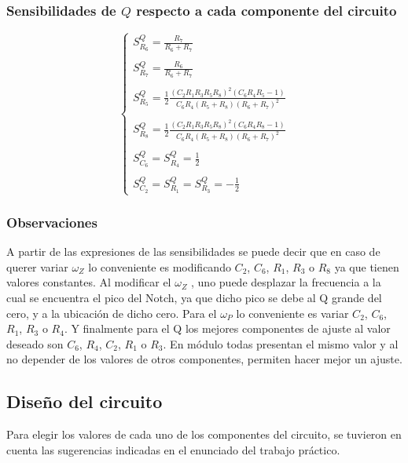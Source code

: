 \subsubsection{Sensibilidades de $Q$ respecto a cada componente del circuito}
\begin{equation}
\begin{cases}
S^{Q}_{R_6} = \frac{R_{7}}{R_{6} + R_{7}}\\ \\
S^{Q}_{R_7} = \frac{R_{6}}{R_{6} + R_{7}}\\ \\
S^{Q}_{R_5} = \frac{1}{2} \frac{(C_{2} R_{1} R_{3} R_{5} R_{8})^2 \left(C_{6} R_{4} R_{5} - 1\right)}{C_{6} R_{4} \left(R_{5} + R_{8}\right) \left(R_{6} + R_{7}\right)^{2}} \\ \\
S^{Q}_{R_8} = \frac{1}{2} \frac{(C_{2} R_{1} R_{3} R_{5} R_{8})^2 \left(C_{6} R_{4} R_{8} - 1\right)}{C_{6} R_{4} \left(R_{5} + R_{8}\right) \left(R_{6} + R_{7}\right)^{2}} \\ \\
S^{Q}_{C_6} = S^{Q}_{R_4} =\frac{1}{2} \\ \\
S^{Q}_{C_2} = S^{Q}_{R_1} = S^{Q}_{R_3} =-\frac{1}{2}
\end{cases}
\end{equation}

\subsubsection{Observaciones}
A partir de las expresiones de las sensibilidades se puede decir que en caso de querer variar $\omega_Z$ lo conveniente es modificando $C_2$, $C_6$, $R_1$, $R_3$ o $R_8$ ya que tienen valores constantes. Al modificar el $\omega_Z$ , uno puede desplazar la frecuencia a la cual se encuentra el pico del Notch, ya que dicho pico se debe al Q grande del cero, y a la ubicaci\'on de dicho cero. Para el $\omega_P$ lo conveniente es variar $C_2$, $C_6$, $R_1$, $R_3$ o $R_4$. Y finalmente para el Q los mejores componentes de ajuste al valor deseado son $C_6$, $R_4$, $C_2$, $R_1$ o $R_3$. En m\'odulo todas presentan el mismo valor y al no depender de los valores de otros componentes, permiten hacer mejor un ajuste. 

\subsection{Dise\~no del circuito}
Para elegir los valores de cada uno de los componentes del circuito, se tuvieron en cuenta las sugerencias indicadas en el enunciado del trabajo pr\'actico.

